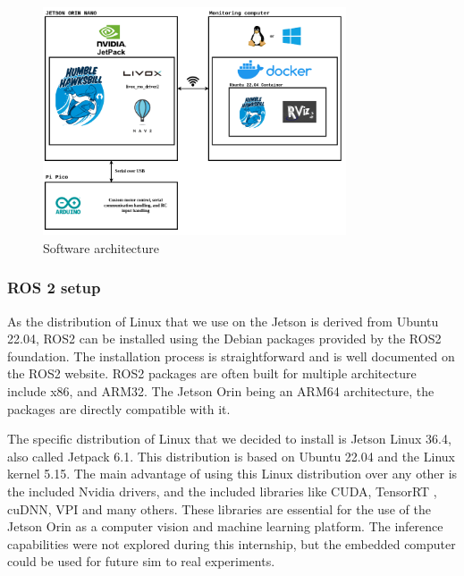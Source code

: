 \documentclass[11pt]{article}
\begin{document}
        \begin{figure}[H]
            \centering
            \includegraphics[width=0.8\textwidth]{Images/Software architecture rover.drawio.png}
            \caption{Software architecture}
            \label{fig:SW_architecture}
        \end{figure}


        \subsubsection{ROS 2 setup}
        
        As the distribution of Linux that we use on the Jetson is derived from Ubuntu 22.04, ROS2 can be installed using the Debian packages provided by the ROS2 foundation. The installation process is straightforward \cite{ros2_installation} and is well documented on the ROS2 website. ROS2 packages are often built for multiple architecture include x86, and ARM32. The Jetson Orin being an ARM64 architecture, the packages are directly compatible with it. 

        The specific distribution of Linux that we decided to install is Jetson Linux 36.4, also called Jetpack 6.1. This distribution is based on Ubuntu 22.04 and the Linux kernel 5.15. The main advantage of using this Linux distribution over any other is the included Nvidia drivers, and the included libraries like CUDA\cite{cuda}, TensorRT \cite{tensorrt}, cuDNN\cite{cudnn}, VPI and many others. These libraries are essential for the use of the Jetson Orin as a computer vision and machine learning platform. The inference capabilities were not explored during this internship, but the embedded computer could be used for future sim to real \cite{peng2018sim} experiments. 
\end{document}
